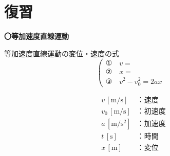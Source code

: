 \documentclass[11pt,twoside]{article}
\begin{document}
\section{\textbf{復習}}
\begin{itembox}[l]{\textbf{〇等加速度直線運動}}
	\begin{minipage}[t]{0.70\linewidth}
	等加速度直線運動の変位・速度の式
	\Large
	\[
	\left(
	\begin{array}{ll}
		\text{①} \quad v = & \\
		\text{②} \quad x = & \\
		\text{③} \quad v^2 - v_0^2 = 2ax &
	\end{array}
	\right.
	\]
	\begin{center}
	\end{center}	
	\end{minipage}
	\hfill
	\begin{minipage}[t]{0.26\linewidth}
		\begin{shadebox}
			\begin{align*}
				v\,[\si{\metre\per\second}] &\text{：速度} \\
				v_0\,[\si{\metre\per\second}] &\text{：初速度} \\
				a\,[\si{\metre\per\second\squared}] &\text{：加速度} \\
				t\,[\si{\second}] &\text{：時間} \\
				x\,[\si{\metre}] &\text{：変位} \\
			\end{align*}
		\end{shadebox}
	\end{minipage}
\end{itembox}
\end{document}

